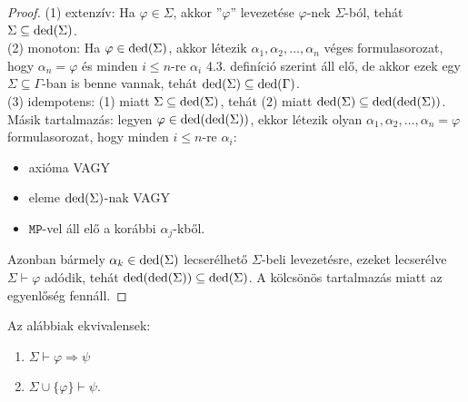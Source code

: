 \begin{proof}
(1) extenzív: Ha $\varphi \in \Sigma$, akkor ''$\varphi$'' levezetése $\varphi$-nek $\Sigma$-ból, tehát $\Sigma \subseteq \mathop{\mathrm{ded}}(\Sigma)$. \\
\indent (2) monoton: Ha $\varphi \in \mathop{\mathrm{ded}}(\Sigma)$, akkor létezik $\alpha_1, \alpha_2, \ldots, \alpha_n$ véges formulasorozat, hogy $\alpha_n=\varphi$ és minden $i \leqslant n$-re $\alpha_i$ 4.3. definíció szerint áll elő, de akkor ezek egy $\Sigma \subseteq \Gamma$-ban is benne vannak, tehát $\mathop{\mathrm{ded}}(\Sigma) \subseteq \mathop{\mathrm{ded}}(\Gamma)$. \\
\indent (3) idempotens: (1) miatt $\Sigma \subseteq \mathop{\mathrm{ded}}(\Sigma)$, tehát (2) miatt $\mathop{\mathrm{ded}}(\Sigma) \subseteq \mathop{\mathrm{ded}}(\mathop{\mathrm{ded}}(\Sigma))$. Másik tartalmazás: legyen $\varphi \in \mathop{\mathrm{ded}}(\mathop{\mathrm{ded}}(\Sigma))$, ekkor létezik olyan $\alpha_1, \alpha_2, \ldots, \alpha_n = \varphi$ formulasorozat, hogy minden $i \leqslant n$-re $\alpha_i$:
\begin{itemize}
\item axióma VAGY
\item eleme $\mathop{\mathrm{ded}}(\Sigma)$-nak VAGY
\item $\texttt{MP}$-vel áll elő a korábbi $\alpha_j$-kből.
\end{itemize} Azonban bármely $\alpha_k \in \mathop{\mathrm{ded}}(\Sigma)$ lecserélhető $\Sigma$-beli levezetésre, ezeket lecserélve $\Sigma \vdash \varphi$ adódik, tehát $\mathop{\mathrm{ded}}(\mathop{\mathrm{ded}}(\Sigma)) \subseteq \mathop{\mathrm{ded}}(\Sigma)$. A kölcsönös tartalmazás miatt az egyenlőség fennáll.
\end{proof}
\begin{theo} Az alábbiak ekvivalensek:
\begin{enumerate}
\item $\Sigma \vdash \varphi \Rightarrow \psi$
\item $\Sigma \cup \lbrace \varphi \rbrace \vdash \psi.$
\end{enumerate}
\end{theo}
